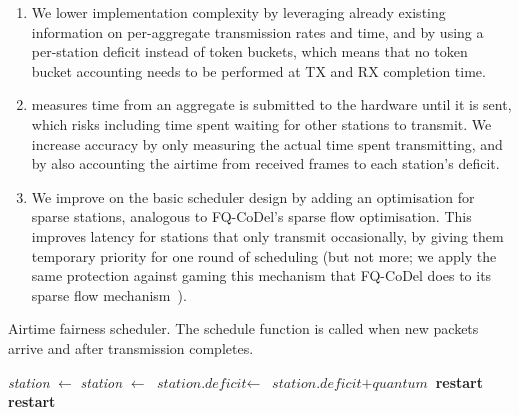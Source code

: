 \documentclass[english]{scrartcl}
\begin{document}
\begin{enumerate}
\item We lower implementation complexity by leveraging already existing information
on per-aggregate transmission rates and time, and by using a per-station
deficit instead of token buckets, which means that no token bucket accounting
needs to be performed at TX and RX completion time.

\item \cite{garroppo_providing_2007} measures time from an aggregate is submitted to
the hardware until it is sent, which risks including time spent waiting for
other stations to transmit. We increase accuracy by only measuring the actual
time spent transmitting, and by also accounting the airtime from received
frames to each station's deficit.

\item We improve on the basic scheduler design by adding an optimisation for sparse
stations, analogous to FQ-CoDel's sparse flow optimisation. This improves
latency for stations that only transmit occasionally, by giving them
temporary priority for one round of scheduling (but not more; we apply the
same protection against gaming this mechanism that FQ-CoDel does to its
sparse flow mechanism \cite{fq-codel}).
\end{enumerate}

\begin{algorithm}
\caption{\small Airtime fairness scheduler. The schedule function is called when new packets arrive and after transmission completes.}
\label{alg:airtime-scheduler}
\begin{algorithmic}[1]
\small
{} \label{ln:beg-schedule}
      \State \emph{station} $\gets$ 
      \State \emph{station} $\gets$ 
    \Else
      \State \Return
    \EndIf
      \State $\textit{station.deficit} \gets $ {\small$\textit{station.deficit} + \textit{quantum}$ }
      \State {}
      \State \textbf{restart}
    \EndIf
        \State {}
      \Else
        \State {}
      \EndIf
      \State \textbf{restart}
    \EndIf
    \State {} \label{ln:q-aggr}
  \EndWhile
\EndFunction \label{ln:end-schedule}
\end{algorithmic}
\end{algorithm}
\end{document}
